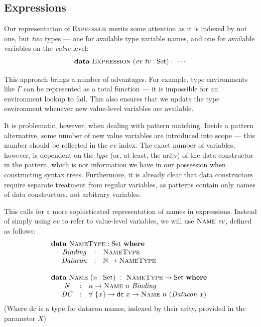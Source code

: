 \documentclass[a4paper]{jfp}
\begin{document}
\subsection{Expressions}

Our representation of \textsc{Expression} merits some attention as it is indexed by not one, but \emph{two} types --- one for available type variable
names, and one for available variables on the \emph{value} level:
\begin{displaymath}
         \textbf{data}\ \textsc{Expression}\ (\mathit{ev}\ \mathit{tv} : \text{Set}) :\ \cdots
\end{displaymath}

This approach brings a number of advantages. For example, type environments like $\Gamma$ can be represented as a total function --- it is impossible
for an environment lookup to fail. This also ensures that we update the type environment whenever new value-level variables are available.

It is problematic, however, when dealing with pattern matching. Inside a pattern alternative, some number of new value variables are introduced into scope
--- this number should be reflected in the $\mathit{ev}$ index.
The exact number of variables, however, is dependent on the \emph{type} (or, at least, the arity) of the data constructor in the pattern, which is not
information we have in our possession when constructing syntax trees. Furthermore, it
is already clear that data constructors require separate treatment from regular variables, as patterns contain only names of data constructors, not
arbitrary variables.

This calls for a more sophisticated representation of names in expressions. Instead of simply using $\mathit{ev}$ to refer to value-level variables,
we will use $\textsc{Name}\ \mathit{ev}$, defined as follows:
\begin{displaymath}
\begin{array}{l}
         \textbf{data}\ \textsc{NameType} : \text{Set}\ \textbf{where} \\
         \quad \begin{array}{cll}
            \mathit{Binding} & : & \textsc{NameType} \\
            \mathit{Datacon} & : & \mathbb{N} \rightarrow \textsc{NameType}
         \end{array} \\ \\
         \textbf{data}\ \textsc{Name}\ (n : \text{Set})\ :\ \textsc{NameType} \rightarrow \text{Set}\ \textbf{where} \\
         \quad \begin{array}{cll}
            \mathit{N} & : & n \rightarrow \textsc{Name}\ n\ \mathit{Binding} \\
            \mathit{DC} & : & \forall\ \{ x \} \rightarrow \textsf{dc}\ x \rightarrow \textsc{Name}\ n\ (\mathit{Datacon}\ x)
         \end{array} 
         \end{array} 
\end{displaymath}
(Where \textsf{dc} is a type for datacon names, indexed by their arity, provided in the parameter $X$)
\end{document}
